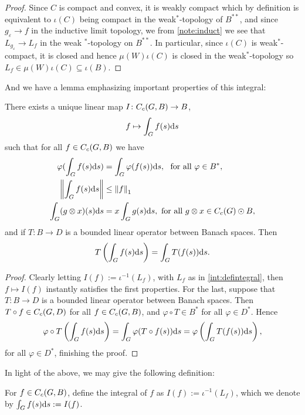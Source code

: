 \begin{proof}
	Since $C$ is compact and convex, it is weakly compact which by definition is equivalent to $\iota(C)$ being compact in the weak$^*$-topology of $B^{**}$, and since $g_{\varepsilon} \to f$ in the inductive limit topology, we from \ref{note:induct} we see that $L_{g_\varepsilon } \to L_f$ in the weak $^*$-topology on $B^{**}$. In particular, since $\iota(C)$ is weak$^*$-compact, it is closed and hence $\mu(W) \iota(C)$ is closed in the weak$^*$-topology so $L_f \in \mu(W) \iota(C) \subseteq \iota(B)$.
\end{proof}
And we have a lemma emphasizing important properties of this integral:
\begin{lemma}
There exists a unique linear map $I \colon C_c(G,B) \to B$,
\begin{align*}
	f \mapsto \int_G f(s) \mathrm{d} s
\end{align*}
such that for all $f \in C_c(G,B)$ we have
\begin{align}
	\varphi(\int_G f(s) \d s ) &= \int_G \varphi(f(s)) \d s, \ \text{ for all } \varphi \in B^*,\\
	\lv \int_G f(s) \d s \rv &\leq \lv f \rv_1 \\
	\int_G (g \otimes x) (s) \d s &=x \int_G g(s) \d s, \text{ for all } g \otimes x \in \cc(G) \odot B,
\end{align}
and if $T \colon B \to D$ is a bounded linear operator between Banach spaces. Then
\begin{align*}
	T\left( \int_G f(s) \mathrm{d} s \right) = \int_G T(f(s)) \mathrm{d} s.
\end{align*}
	\label{int:bochnerproperties}
\end{lemma}
\begin{proof}
	Clearly letting $I(f) := \iota^{-1}(L_f)$, with $L_f$ as in \ref{int:defintegral}, then $f \mapsto I(f)$ instantly satisfies the first properties. For the last, suppose that $T \colon B \to D$ is a bounded linear operator between Banach spaces. Then $T \circ f \in C_c(G,D)$ for all $f \in C_c(G,B)$, and $\varphi \circ T \in B^*$ for all $ \varphi \in D^*$. Hence 
	\begin{align*}
		\varphi \circ T \left( \int_G f(s) \mathrm{d} s  \right) = \int_G \varphi( T \circ f (s) ) \mathrm{d} s = \varphi \left( \int_G T (f(s)) \mathrm{d} s \right),
	\end{align*}
	for all $\varphi \in D^*$, finishing the proof.
\end{proof}
In light of the above, we may give the following definition:
\begin{definition}
	For $f \in C_c(G,B)$, define the integral of $f$ as $I(f) := \iota^{-1}(L_f)$, which we denote by $\int_G f(s) \mathrm{d} s := I(f)$.
\end{definition}

